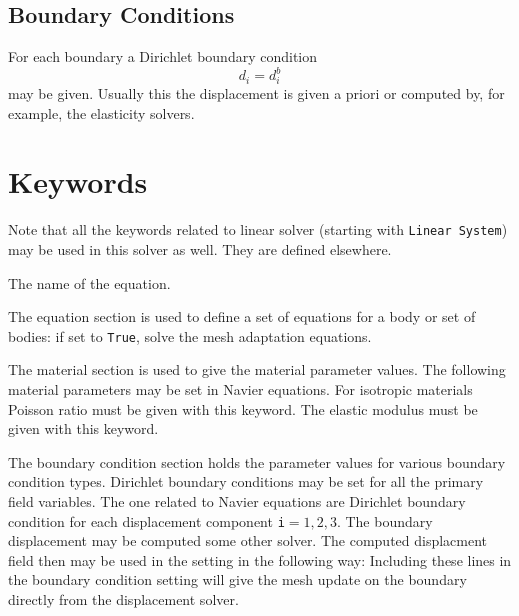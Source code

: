 \subsection{Boundary Conditions}

For each boundary a Dirichlet boundary condition
\begin{equation}
d_i = d_i^b
\end{equation}
may be given. Usually this the displacement is given a priori or computed
by, for example, the elasticity solvers.

\section{Keywords} 

\sifbegin

Note that all the keywords related to linear solver (starting
with {\tt Linear System})
may be used in this solver as well.  They are defined elsewhere. 

\sifbegin
{} 
The name of the equation.
\sifend

The equation section is used to define a set of equations for a body or set of bodies:
\sifbegin
{} if set to {\tt True}, solve the mesh adaptation equations.
\sifend

The material section is used to give the material parameter values. The
following material parameters may be set in Navier equations.
\sifbegin
{} 
For isotropic materials Poisson ratio must be given with this keyword.
 The elastic modulus must be given with this
keyword.
\sifend


The boundary condition section holds the parameter values for various
boundary condition types. Dirichlet boundary conditions may be
set for all the primary field variables. The one related to Navier equations
are
\sifbegin
{} 
Dirichlet boundary condition
for each displacement component {\tt i}$=1,2,3$.
The boundary displacement may be computed some other solver. The computed
displacment field then may be used in the setting in the following way:
Including these lines in the boundary condition setting will give
the mesh update on the boundary directly from the displacement solver.
\sifend
\sifend


